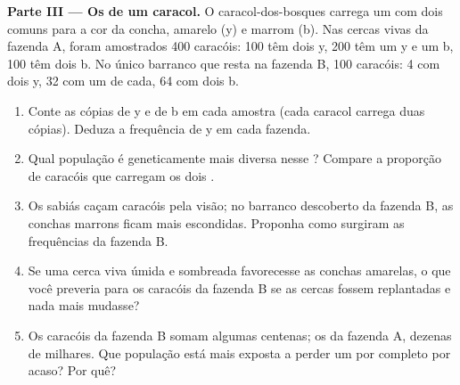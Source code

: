 \begin{problem}
\medskip
\noindent\textbf{Parte III --- Os  de um caracol.}
O caracol-dos-bosques carrega um  com dois  comuns para a cor
da concha, amarelo (y) e marrom (b). Nas cercas vivas da fazenda A,
foram amostrados 400 caracóis: 100 têm dois  y, 200 têm um y e um
b, 100 têm dois b. No único barranco que resta na fazenda B, 100
caracóis: 4 com dois y, 32 com um de cada, 64 com dois b.
\begin{enumerate}[resume]
  \item Conte as cópias de y e de b em cada amostra (cada caracol
        carrega duas cópias). Deduza a frequência de y em cada fazenda.
  \item Qual população é geneticamente mais diversa nesse ?
        Compare a proporção de caracóis que carregam os dois .
  \item Os sabiás caçam caracóis pela visão; no barranco descoberto da
        fazenda B, as conchas marrons ficam mais escondidas. Proponha
        como surgiram as frequências da fazenda B.
  \item Se uma cerca viva úmida e sombreada favorecesse as conchas
        amarelas, o que você preveria para os caracóis da fazenda B se
        as cercas fossem replantadas e nada mais mudasse?
  \item Os caracóis da fazenda B somam algumas centenas; os da fazenda
        A, dezenas de milhares. Que população está mais exposta a
        perder um  por completo por acaso? Por quê?
\end{enumerate}


\end{problem}
